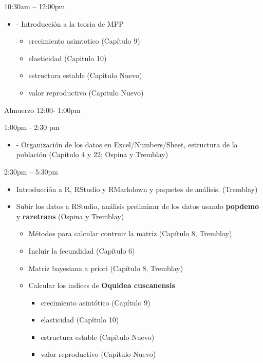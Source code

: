 \documentclass[
]{book}
\providecommand{\tightlist}{%
  \setlength{\itemsep}{0pt}\setlength{\parskip}{0pt}}
\theoremstyle{definition}
\theoremstyle{definition}
\theoremstyle{definition}
\theoremstyle{definition}
\theoremstyle{remark}
\begin{document}
10:30am -- 12:00pm

\begin{itemize}
\tightlist
\item
  - Introducción a la teoria de MPP

  \begin{itemize}
  \tightlist
  \item
    crecimiento asimtotico (Capítulo 9)
  \item
    elasticidad (Capitulo 10)
  \item
    estructura estable (Capitulo Nuevo)
  \item
    valor reproductivo (Capitulo Nuevo)
  \end{itemize}
\end{itemize}

Almuerzo 12:00- 1:00pm

1:00pm - 2:30 pm

\begin{itemize}
\tightlist
\item
  - Organización de los datos en Excel/Numbers/Sheet, estructura de
  la población (Capítulo 4 y 22; Ospina y Tremblay)
\end{itemize}

2:30pm -- 5:30pm

\begin{itemize}
\item
  Introducción a R, RStudio y RMarkdown y paquetes de análisis.
  (Tremblay)
\item
  Subir los datos a RStudio, análisis preliminar de los datos usando
  \textbf{popdemo} y \textbf{raretrans} (Ospina y Tremblay)

  \begin{itemize}
  \tightlist
  \item
    Métodos para calcular contruir la matriz (Capítulo 8, Tremblay)
  \item
    Incluir la fecundidad (Capítulo 6)
  \item
    Matriz bayesiana a priori (Capítulo 8, Tremblay)
  \item
    Calcular los indices de \textbf{Oquidea cuscanensis}

    \begin{itemize}
    \tightlist
    \item
      crecimiento asintótico (Capítulo 9)
    \item
      elasticidad (Capítulo 10)
    \item
      estructura estable (Capítulo Nuevo)
    \item
      valor reproductivo (Capítulo Nuevo)
    \end{itemize}
  \end{itemize}
\end{itemize}
\end{document}
